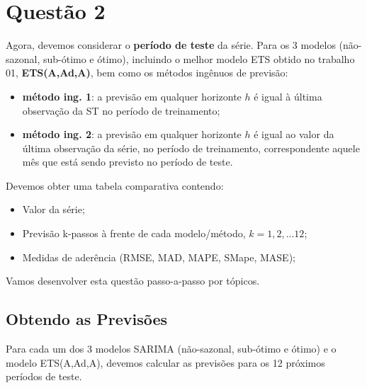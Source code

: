 \documentclass[a4paper, 12pt]{article}
\begin{document}
\section{Questão 2}

Agora, devemos considerar o \textbf{período de teste} da série. Para os 3 modelos (não-sazonal, sub-ótimo e ótimo), incluindo o melhor modelo ETS obtido no trabalho 01, \textbf{ETS(A,Ad,A)}, bem como os métodos ingênuos de previsão:

\begin{itemize}
    \item \textbf{método ing. 1}: a previsão em qualquer horizonte $h$ é igual à última observação da ST no período de treinamento;
    \item \textbf{método ing. 2}: a previsão em qualquer horizonte $h$ é igual ao valor da última observação da série, no período de treinamento, correspondente aquele mês que está sendo previsto no período de teste.
\end{itemize}

Devemos obter uma tabela comparativa contendo:

\begin{itemize}
    \item Valor da série;
    \item Previsão k-passos à frente de cada modelo/método, $k=1,2,...12$;
    \item Medidas de aderência (RMSE, MAD, MAPE, SMape, MASE);
\end{itemize}

Vamos desenvolver esta questão passo-a-passo por tópicos.

\subsection{Obtendo as Previsões}

Para cada um dos 3 modelos SARIMA (não-sazonal, sub-ótimo e ótimo) e o modelo ETS(A,Ad,A), devemos calcular as previsões para os 12 próximos períodos de teste.\\
\end{document}
